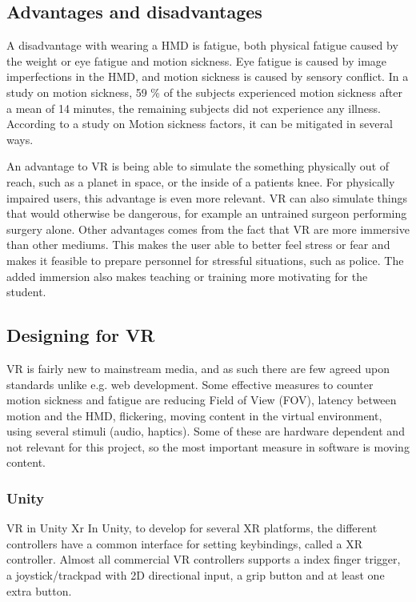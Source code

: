 \documentclass[a4paper]{report}
\begin{document}
\subsection{Advantages and disadvantages}
A disadvantage with wearing a HMD is fatigue, both physical fatigue caused by the weight or eye fatigue and motion sickness\cite{merhi_motion_2007}.
Eye fatigue is caused by image imperfections in the HMD\cite{kooi_visual_2004}, and motion sickness is caused by sensory conflict.
In a study on motion sickness, 59 \% of the subjects experienced motion sickness after a mean of 14 minutes, the remaining subjects did not experience any illness\cite{kooi_visual_2004}. According to a study on Motion sickness factors, it can be mitigated in several ways.

An advantage to VR is being able to simulate the something physically out of reach, such as a planet in space, or the inside of a patients knee. For physically impaired users, this advantage is even more relevant.
VR can also simulate things that would otherwise be dangerous, for example an untrained surgeon performing surgery alone.
Other advantages comes from the fact that VR are more immersive than other mediums. This makes the user able to better feel stress or fear and makes it feasible to prepare personnel for stressful situations, such as police.
The added immersion also makes teaching or training more motivating for the student.\cite{freina_immersive_2015}

\subsection{Designing for VR}
VR is fairly new to mainstream media, and as such there are few agreed upon standards unlike e.g. web development.
Some effective measures to counter motion sickness and fatigue are reducing Field of View (FOV), latency between motion and the HMD, flickering, moving content in the virtual environment, using several stimuli (audio, haptics)\cite{chang_virtual_2020}. Some of these are hardware dependent and not relevant for this project, so the most important measure in software is moving content.
\subsubsection{Unity}
VR in Unity
Xr
In Unity, to develop for several XR platforms, the different controllers have a common interface for setting keybindings, called a XR controller. Almost all commercial VR controllers supports a index finger trigger, a joystick/trackpad with 2D directional input, a grip button and at least one extra button\cite{technologies_unity_nodate}.
\end{document}
